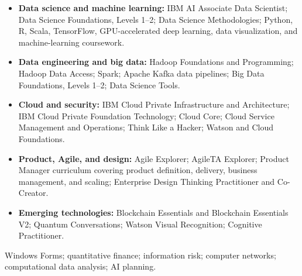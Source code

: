 \smallskip
{}
\begin{itemize}
  \item \textbf{Data science and machine learning:} IBM AI Associate Data Scientist; Data Science Foundations, Levels 1--2; Data Science Methodologies; Python, R, Scala, TensorFlow, GPU-accelerated deep learning, data visualization, and machine-learning coursework.
  \item \textbf{Data engineering and big data:} Hadoop Foundations and Programming; Hadoop Data Access; Spark; Apache Kafka data pipelines; Big Data Foundations, Levels 1--2; Data Science Tools.
  \item \textbf{Cloud and security:} IBM Cloud Private Infrastructure and Architecture; IBM Cloud Private Foundation Technology; Cloud Core; Cloud Service Management and Operations; Think Like a Hacker; Watson and Cloud Foundations.
  \item \textbf{Product, Agile, and design:} Agile Explorer; AgileTA Explorer; Product Manager curriculum covering product definition, delivery, business management, and scaling; Enterprise Design Thinking Practitioner and Co-Creator.
  \item \textbf{Emerging technologies:} Blockchain Essentials and Blockchain Essentials V2; Quantum Conversations; Watson Visual Recognition; Cognitive Practitioner.
\end{itemize}

\smallskip
{}
Windows Forms; quantitative finance; information risk; computer networks; computational data analysis; AI planning.
